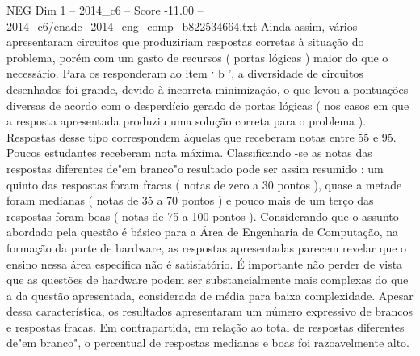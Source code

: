 \begin{textsample}{NEG Dim 1 – 2014\_c6 – Score -11.00 – 2014\_c6/enade\_2014\_eng\_comp\_b822534664.txt}
Ainda assim, vários apresentaram circuitos que produziriam respostas corretas à situação do problema, porém com um gasto de recursos ( portas lógicas ) maior do que o necessário.
Para os responderam ao item ‘ b ’, a diversidade de circuitos desenhados foi grande, devido à incorreta minimização, o que levou a pontuações diversas de acordo com o desperdício gerado de portas lógicas ( nos casos em que a resposta apresentada produziu uma solução correta para o problema ).
Respostas desse tipo correspondem àquelas que receberam notas entre 55 e 95.
Poucos estudantes receberam nota máxima.
Classificando -se as notas das respostas diferentes de"em branco"o resultado pode ser assim resumido : um quinto das respostas foram fracas ( notas de zero a 30 pontos ), quase a metade foram medianas ( notas de 35 a 70 pontos ) e pouco mais de um terço das respostas foram boas ( notas de 75 a 100 pontos ).
Considerando que o assunto abordado pela questão é básico para a Área de Engenharia de Computação, na formação da parte de hardware, as respostas apresentadas parecem revelar que o ensino nessa área específica não é satisfatório.
É importante não perder de vista que as questões de hardware podem ser substancialmente mais complexas do que a da questão apresentada, considerada de média para baixa complexidade.
Apesar dessa característica, os resultados apresentaram um número expressivo de brancos e respostas fracas.
Em contrapartida, em relação ao total de respostas diferentes de"em branco", o percentual de respostas medianas e boas foi razoavelmente alto.

\end{textsample}
